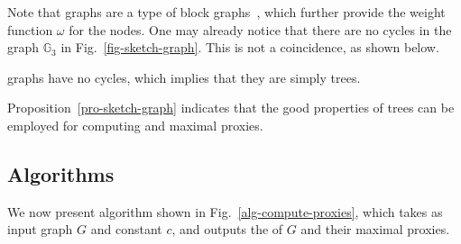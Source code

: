 Note that \bcsketch graphs are a type of block graphs~\cite{Diestel05}, which further provide the weight function $\omega$ for the \bccs nodes.
%
One may already notice that there are no cycles in the \bcsketch graph $\mathbb{G}_3$ in Fig.~\ref{fig-sketch-graph}. This is not a coincidence, as shown below.

\begin{prop}
\label{pro-sketch-graph} \bcsketch graphs have no cycles, which implies that they are simply trees.
\end{prop}



Proposition~\ref{pro-sketch-graph} indicates that the good properties of trees can be employed for computing \dras and maximal proxies.



\subsection{Algorithms}
\label{subsec-alg}
We now present algorithm \compDRAs shown in Fig.~\ref{alg-compute-proxies}, which takes as input graph $G$ and constant $c$, and outputs the \dras of $G$ and their maximal proxies.

